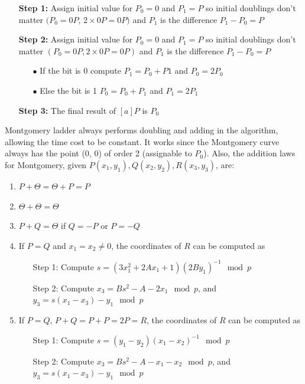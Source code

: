 \begin{itemize}[leftmargin=2.5cm]
  \item[\textbf{Step 1:}] Assign initial value for $P_0 = 0$ and $P_1 = P$ so initial doublings don’t matter $(P_0 =0P$, $2 \times 0P = 0P)$ and $P_1$ is the difference $P_1 - P_0 = P$
  \item[\textbf{Step 2:}] Assign initial value for $P_0 = 0$ and $P_1 = P$ so initial doublings don’t matter $(P_0 =0P, 2 \times 0P = 0P)$ and $P_1$ is the difference $P_1 - P_0 = P$

        \begin{itemize}
          \item[$\bullet$] If the bit is 0 compute $P_1 = P_0 +  P1$ and $P_0 = 2P_0$
          \item[$\bullet$] Else the bit is 1 $P_0 = P_0 +  P_1$ and $P_1 = 2P_1$
        \end{itemize}

  \item[\textbf{Step 3:}] The final result of $[a]P$ is $P_0$
\end{itemize}

Montgomery ladder always performs doubling and adding in the algorithm, allowing the time cost to be constant. It works since the Montgomery curve always has the point (0, 0) of order 2 (assignable to $P_0$). Also, the addition laws for Montgomery, given $P(x_1, y_1), Q(x_2, y_2), R(x_3, y_3)$, are:

\begin{enumerate}
  \item $P + \Theta = \Theta + P = P$
  \item $\Theta + \Theta = \Theta$
  \item $P + Q = \Theta$ if $Q = -P$ or $P = -Q$
  \item If $P = Q$ and $x_1 = x_2 \neq 0$, the coordinates of $R$ can be computed as

        \begin{itemize}[leftmargin=2cm]
          \item[Step 1:] Compute $s = (3x_1^2 + 2Ax_1 + 1) (2By_1)^{-1} \mod p$
          \item[Step 2:] Compute $x_3 = Bs^2 - A - 2x_1 \mod p$, and $y_3 = s(x_1 - x_3) - y_1 \mod p$
        \end{itemize}

  \item If $P = Q$, $P + Q = P + P = 2P = R$, the coordinates of $R$ can be computed as

        \begin{itemize}[leftmargin=2cm]
          \item[Step 1:] Compute $s = (y_1 - y_2) (x_1 - x_2)^{-1} \mod p$
          \item[Step 2:] Compute $x_3 = Bs^2 - A - x_1 - x_2 \mod p$, and $y_3 = s(x_1 - x_3) - y_1 \mod p$
        \end{itemize}
\end{enumerate}

